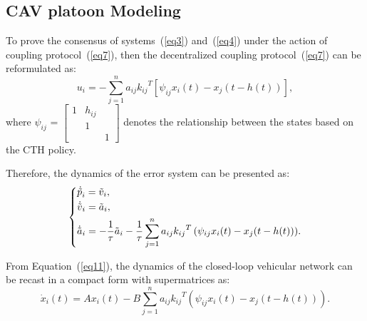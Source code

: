 \documentclass[a4paper]{cas-sc}
\begin{document}
\subsection{CAV platoon Modeling}
\label{Section 3.2}

To prove the consensus of systems~(\ref{eq3}) and~(\ref{eq4}) under the action of coupling protocol~(\ref{eq7}), then the decentralized coupling protocol~(\ref{eq7}) can be reformulated as:
\begin{equation}
  {u_i} =  - \sum\limits_{j = 1}^n {{a_{ij}}{k_{ij}}^T\left[ {{\psi _{ij}}{x_i}(t) - {x_j}(t - h(t))} \right]},
  \label{eq10}
\end{equation}
where $ {\psi _{ij}}{\text{ = }}\left[ {\begin{array}{*{20}{c}}
          1  & {{h_{ij}}} & {} \\
          {} & 1          & {} \\
          {} & {}         & 1
        \end{array}} \right] $ denotes the relationship between the states based on the CTH policy.

Therefore, the dynamics of the error system can be presented as:
\begin{equation}
  \left\{ \begin{gathered}
    {{\dot {\tilde p}}_i} = {{\tilde v}_i}, \hfill \\
    {{\dot {\tilde v}}_i} = {{\tilde a}_i}, \hfill\\
    {{\dot {\tilde a}}_i} =  - \frac{1}{\tau }{{\tilde a}_i} - \frac{1}{\tau }\sum\limits_{j = 1}^n {{a_{ij}}{k_{ij}}^T\left( {{\psi _{ij}}{x_i}(t) - {x_j}(t - h(t))} \right)}.  \hfill \\
  \end{gathered}  \right.
  \label{eq11}
\end{equation}

From Equation~(\ref{eq11}), the dynamics of the closed-loop vehicular network can be recast in a compact form with supermatrices as:
\begin{equation}
  {\dot x_i}\left( t \right) = A{x_i}\left( t \right) - B\sum\limits_{j = 1}^n {{a_{ij}}{k_{ij}}^T\left( {{\psi _{ij}}{x_i}(t) - {x_j}(t - h(t))} \right)}.
  \label{eq12}
\end{equation}
\end{document}
